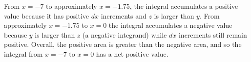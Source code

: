 From $x = -7$ to approximately $x = -1.75$, the integral accumulates a positive value because it has positive $dx$ increments and $z$ is larger than $y$.  From approximately $x = -1.75$ to $x = 0$ the integral accumulates a negative value because $y$ is larger than $z$ (a negative integrand) while $dx$ increments still remain positive.  Overall, the positive area is greater than the negative area, and so the integral from $x = -7$ to $x = 0$ has a net positive value.











